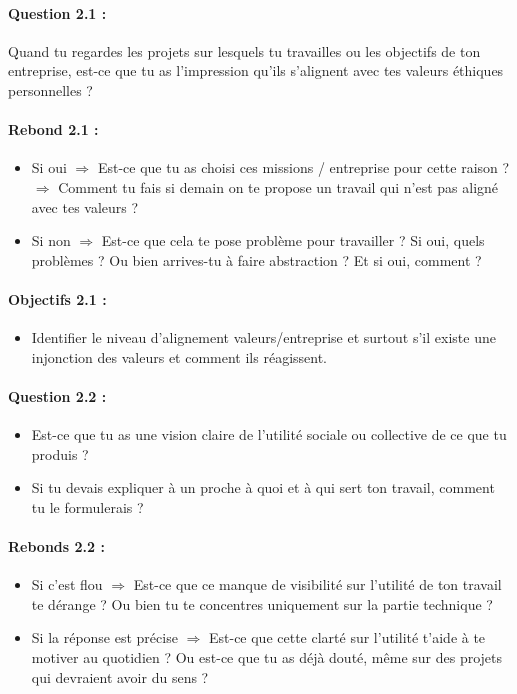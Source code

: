 \documentclass[12pt,a4paper]{report}
\begin{document}
\paragraph{Question 2.1 :}
Quand tu regardes les projets sur lesquels tu travailles ou les objectifs de ton entreprise, est-ce que tu as l'impression qu'ils s'alignent avec tes valeurs éthiques personnelles ?

\paragraph{Rebond 2.1 :}
\begin{itemize}
    \item Si oui $\Rightarrow$ Est-ce que tu as choisi ces missions / entreprise pour cette raison ? $\Rightarrow$ Comment tu fais si demain on te propose un travail qui n'est pas aligné avec tes valeurs ?
    \item Si non $\Rightarrow$ Est-ce que cela te pose problème pour travailler ? Si oui, quels problèmes ? Ou bien arrives-tu à faire abstraction ? Et si oui, comment ?
\end{itemize}

\paragraph{Objectifs 2.1 :}
\begin{itemize}
    \item Identifier le niveau d'alignement valeurs/entreprise et surtout s'il existe une injonction des valeurs et comment ils réagissent.
\end{itemize}

\paragraph{Question 2.2 :}
\begin{itemize}
    \item Est-ce que tu as une vision claire de l'utilité sociale ou collective de ce que tu produis ?
    \item Si tu devais expliquer à un proche à quoi et à qui sert ton travail, comment tu le formulerais ?
\end{itemize}

\paragraph{Rebonds 2.2 :}
\begin{itemize}
    \item Si c'est flou $\Rightarrow$ Est-ce que ce manque de visibilité sur l'utilité de ton travail te dérange ? Ou bien tu te concentres uniquement sur la partie technique ?
    \item Si la réponse est précise $\Rightarrow$ Est-ce que cette clarté sur l'utilité t'aide à te motiver au quotidien ? Ou est-ce que tu as déjà douté, même sur des projets qui devraient avoir du sens ?
\end{itemize}
\end{document}
